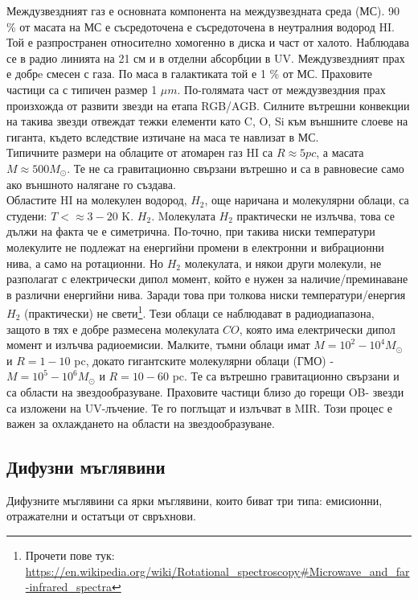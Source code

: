 \documentclass[a4paper,12pt]{article}
\begin{document}
Междузвездният газ е основната компонента на междузвездната среда (МС). 90 \%  от масата на МС е съсредоточена е съсредоточена в неутралния водород HI. Той е разпространен относително хомогенно в диска и част от халото. Наблюдава се в радио линията на 21 см и в отделни абсорбции в UV. Междузвездният прах е добрe смесен с газа. По маса в галактиката той е 1 \% от МС. Праховите частици са с типичен размер 1 $\mu m$. По-голямата част от междузвездния прах произхожда от развити звезди на етапа RGB/AGB. Силните вътрешни конвекции на такива звезди отвеждат тежки елементи като C, O, Si към външните слоеве на гиганта, където вследствие изтичане на маса те навлизат в МС.\\

Типичните размери на облаците от атомарен газ HI са $R \approx 5 pc$, а масата $M \approx 500 M_\odot$. Те не са гравитационно свързани вътрешно и са в равновесие само ако външното налягане го създава.\\

Областите HI на молекулен водород, $H_2$, още наричана и молекулярни облаци, са студени: $T < \approx 3-20$ K. $H_2$. Mолекулата $H_2$ практически не излъчва, това се дължи на факта че е симетрична. По-точно, при такива ниски температури молекулите не подлежат на енергийни промени в електронни и вибрационни нива, а само на ротационни. Но $H_2$ молекулата, и някои други молекули, не разполагат с електрически дипол момент, който е нужен за наличие/преминаване в различни енергийни нива. Заради това при толкова ниски температури/енергия $H_2$ (практически) не свети\footnote{Прочети пове тук: \url{https://en.wikipedia.org/wiki/Rotational_spectroscopy\#Microwave_and_far-infrared_spectra}}. Тези облаци се наблюдават в радиодиапазона, защото в тях е добре размесена молекулата $CO$, която има електрически дипол момент и излъчва радиоемисии. Малките, тъмни облаци имат $M = 10^2 - 10^4 M_\odot$ и $R = 1-10$ pc, докато гигантските молекулярни облаци (ГМО) - $M = 10^5 - 10^6 M_\odot$ и $R = 10 - 60$ pc.  Те са вътрешно гравитационно свързани и са области на звездообразуване. Праховите частици близо до горещи OB- звезди са изложени на UV-лъчение. Те го поглъщат и излъчват в MIR. Този процес е важен за охлаждането на области на звездообразуване.

\subsection{Дифузни мъглявини}

Дифузните мъглявини са ярки мъглявини, които биват три типа: емисионни, отражателни и остатъци от свръхнови.\\
\end{document}

